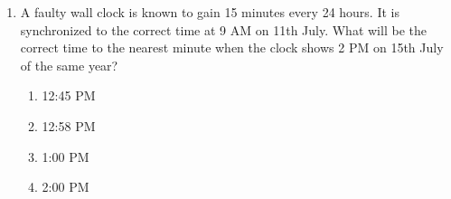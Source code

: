\documentclass[journal]{IEEEtran}
\begin{document}
\begin{enumerate}
{    	
    	\begin{multicols}{4}
    		\begin{enumerate}
    			\item 400 
    			\item 1200 
    			\item 1600
    			\item 2800
    		\end{enumerate}
    	\end{multicols}
    
	}
    \item{
            A faulty wall clock is known to gain 15 minutes every 24 hours. It is synchronized to the correct time at 9 AM on 11th July. What will be the correct time to the nearest minute when the clock shows 2 PM on 15th July of the same year?
            
            
                
            \begin{multicols}{4}
                \begin{enumerate}
                	\item 12:45 PM 
                	\item 12:58 PM
                	\item 1:00 PM
                	\item 2:00 PM
                \end{enumerate}
            \end{multicols}

        
}
\end{enumerate}
\end{document}
